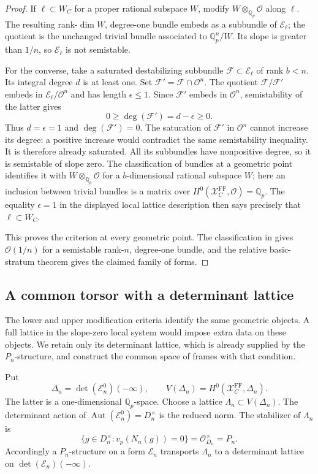 \documentclass[11pt]{article}
\numberwithin{equation}{section}
\theoremstyle{definition}
\theoremstyle{remark}
\newcommand{\Q}{\mathbb Q}
\newcommand{\cO}{\mathcal O}
\DeclareMathOperator{\Aut}{Aut}
\begin{document}
\begin{proof}
If $\ell\subset W_C$ for a proper rational subspace $W$, modify
$W\otimes_{\Q_p}\cO$ along $\ell$.  The resulting rank-$\dim W$,
degree-one bundle embeds as a subbundle of $\mathcal E_\ell$; the
quotient is the unchanged trivial bundle associated to $\Q_p^n/W$.
Its slope is greater than $1/n$, so $\mathcal E_\ell$ is not semistable.

For the converse, take a saturated destabilizing subbundle
$\mathcal F\subset\mathcal E_\ell$ of rank $b<n$.
Its integral degree $d$ is at least one.  Set
$\mathcal F'=\mathcal F\cap\cO^n$.  The quotient
$\mathcal F/\mathcal F'$ embeds in $\mathcal E_\ell/\cO^n$ and has
length $\epsilon\leq1$.  Since $\mathcal F'$ embeds in $\cO^n$,
semistability of the latter gives
\[
 0\geq\deg(\mathcal F')=d-\epsilon\geq0.
\]
Thus $d=\epsilon=1$ and $\deg(\mathcal F')=0$.
The saturation of $\mathcal F'$ in $\cO^n$ cannot increase its degree:
a positive increase would contradict the same semistability inequality.
It is therefore already saturated.  All its subbundles have
nonpositive degree, so it is semistable of slope zero.  The
classification of bundles at a geometric point identifies it with
$W\otimes_{\Q_p}\cO$ for a $b$-dimensional rational subspace $W$;
here an inclusion between trivial bundles is a matrix over
$H^0(\mathcal X_C^{\mathrm{FF}},\cO)=\Q_p$.
The equality $\epsilon=1$ in the displayed local lattice description
then says precisely that $\ell\subset W_C$.

This proves the criterion at every geometric point.  The classification
in \cite[Theorem II.2.14]{FS} gives $\cO(1/n)$ for a semistable
rank-$n$, degree-one bundle, and the
relative basic-stratum theorem gives the claimed family of forms.
\end{proof}

\subsection{A common torsor with a determinant lattice}

The lower and upper modification criteria identify the same geometric
objects. A full lattice in the slope-zero local system would impose
extra data on these objects. We retain only its determinant lattice,
which is already supplied by the $P_n$-structure, and construct the
common space of frames with that condition.

Put
\[
 \Delta_n=\det(\mathcal E_n^0)(-\infty),\qquad
 V(\Delta_n)=H^0(\mathcal X_C^{\mathrm{FF}},\Delta_n).
\]
The latter is a one-dimensional $\Q_p$-space.  Choose a lattice
$\Lambda_n\subset V(\Delta_n)$.
The determinant action of
$\Aut(\mathcal E_n^0)=D_n^\times$ is the reduced norm.
The stabilizer of $\Lambda_n$ is
\[
 \{g\in D_n^\times:v_p(N_n(g))=0\}
       =\cO_{D_n}^{\times}=P_n.
\]
Accordingly a $P_n$-structure on a form $\mathcal E_n$ transports
$\Lambda_n$ to a determinant lattice on
$\det(\mathcal E_n)(-\infty)$.
\end{document}
